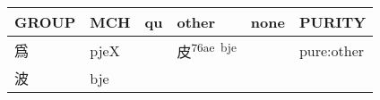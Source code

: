 \documentclass[14pt,a4paper]{scrartcl}
\begin{document}
\begin{longtable}[c]{@{}llllll@{}}
\toprule
\begin{minipage}[b]{0.14\columnwidth}\raggedright\strut
GROUP
\strut\end{minipage} &
\begin{minipage}[b]{0.14\columnwidth}\raggedright\strut
MCH
\strut\end{minipage} &
\begin{minipage}[b]{0.14\columnwidth}\raggedright\strut
qu
\strut\end{minipage} &
\begin{minipage}[b]{0.14\columnwidth}\raggedright\strut
other
\strut\end{minipage} &
\begin{minipage}[b]{0.14\columnwidth}\raggedright\strut
none
\strut\end{minipage} &
\begin{minipage}[b]{0.14\columnwidth}\raggedright\strut
PURITY
\strut\end{minipage}\tabularnewline
\midrule
\endhead
\begin{minipage}[t]{0.14\columnwidth}\raggedright\strut
爲
\strut\end{minipage} &
\begin{minipage}[t]{0.14\columnwidth}\raggedright\strut
pjeX
\strut\end{minipage} &
\begin{minipage}[t]{0.14\columnwidth}\raggedright\strut
\strut\end{minipage} &
\begin{minipage}[t]{0.14\columnwidth}\raggedright\strut
皮\textsuperscript{76ae~bje}
\strut\end{minipage} &
\begin{minipage}[t]{0.14\columnwidth}\raggedright\strut
\strut\end{minipage} &
\begin{minipage}[t]{0.14\columnwidth}\raggedright\strut
pure:other
\strut\end{minipage}\tabularnewline
\begin{minipage}[t]{0.14\columnwidth}\raggedright\strut
波
\strut\end{minipage} &
\begin{minipage}[t]{0.14\columnwidth}\raggedright\strut
bje
\strut\end{minipage} &
\begin{minipage}[t]{0.14\columnwidth}\raggedright\strut
\strut\end{minipage} &
\begin{minipage}[t]{0.14\columnwidth}\raggedright\strut

\end{minipage}
\end{longtable}
\end{document}
